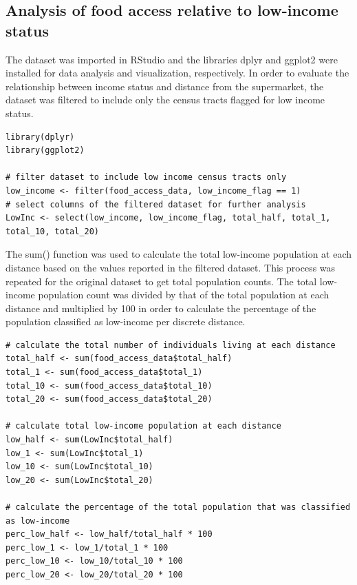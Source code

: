 \documentclass[letterpaper]{article} %
\begin{document}
\subsection{Analysis of food access relative to low-income status}

The dataset was imported in RStudio and the libraries dplyr and ggplot2 were installed for data analysis and visualization, respectively. In order to evaluate the relationship between income status and distance from the supermarket, the dataset was filtered to include only the census tracts flagged for low income status. 

\lstset{language=R}
\begin{lstlisting}[frame=single]   
library(dplyr)
library(ggplot2)

# filter dataset to include low income census tracts only
low_income <- filter(food_access_data, low_income_flag == 1)
# select columns of the filtered dataset for further analysis
LowInc <- select(low_income, low_income_flag, total_half, total_1, total_10, total_20)
\end{lstlisting}

The sum() function was used to calculate the total low-income population at each distance based on the values reported in the filtered dataset. This process was repeated for the original dataset to get total population counts. The total low-income population count was divided by that of the total population at each distance and multiplied by 100 in order to calculate the percentage of the population classified as low-income per discrete distance. 

\lstset{language=R}
\begin{lstlisting}[frame=single] 
# calculate the total number of individuals living at each distance
total_half <- sum(food_access_data$total_half)
total_1 <- sum(food_access_data$total_1)
total_10 <- sum(food_access_data$total_10)
total_20 <- sum(food_access_data$total_20)

# calculate total low-income population at each distance
low_half <- sum(LowInc$total_half)
low_1 <- sum(LowInc$total_1)
low_10 <- sum(LowInc$total_10)
low_20 <- sum(LowInc$total_20)

# calculate the percentage of the total population that was classified as low-income
perc_low_half <- low_half/total_half * 100
perc_low_1 <- low_1/total_1 * 100
perc_low_10 <- low_10/total_10 * 100
perc_low_20 <- low_20/total_20 * 100

\end{lstlisting}
\end{document}
